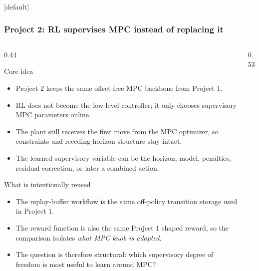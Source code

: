 \documentclass[aspectratio=169]{beamer}
\begin{document}
\begin{frame}
[default]
\frametitle{\large \textbf{Project 2: RL supervises MPC instead of replacing it}}
\scriptsize
\vspace{-0.30cm}

\begin{columns}[T,onlytextwidth]

\begin{column}{0.44\textwidth}

\begin{block}{Core idea}
\begin{itemize}\justifying
  \setlength{\itemsep}{0.35ex}
  \item Project 2 keeps the same offset-free MPC backbone from Project 1.
  \item RL does not become the low-level controller; it only chooses supervisory MPC parameters online.
  \item The plant still receives the first move from the MPC optimizer, so constraints and receding-horizon structure stay intact.
  \item The learned supervisory variable can be the horizon, model, penalties, residual correction, or later a combined action.
\end{itemize}
\end{block}

\vspace{0.02cm}

\begin{block}{What is intentionally reused}
\begin{itemize}\justifying
  \setlength{\itemsep}{0.35ex}
  \item The replay-buffer workflow is the same off-policy transition storage used in Project 1.
  \item The reward function is also the same Project 1 shaped reward, so the comparison isolates \emph{what MPC knob is adapted}.
  \item The question is therefore structural: which supervisory degree of freedom is most useful to learn around MPC?
\end{itemize}
\end{block}

\end{column}

\begin{column}{0.53\textwidth}
\centering
\vspace{0.15cm}


\end{column}
\end{columns}
\end{frame}
\end{document}

